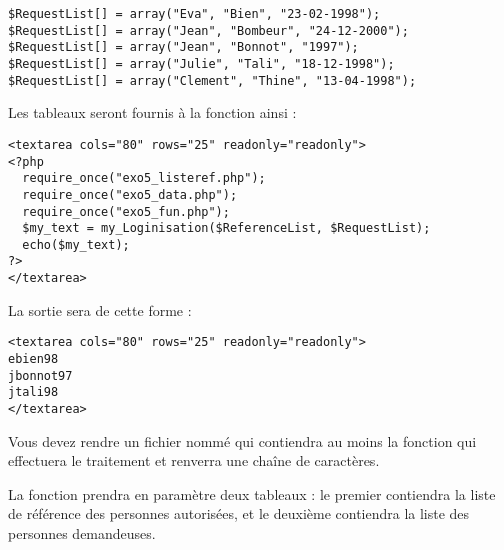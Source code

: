 \lstset{language=sh}
\begin{lstlisting}[frame=single,title={Exemple de liste de demandes}]
$RequestList[] = array("Eva", "Bien", "23-02-1998");
$RequestList[] = array("Jean", "Bombeur", "24-12-2000");
$RequestList[] = array("Jean", "Bonnot", "1997");
$RequestList[] = array("Julie", "Tali", "18-12-1998");
$RequestList[] = array("Clement", "Thine", "13-04-1998");
\end{lstlisting}

\bigskip

\noindent Les tableaux seront fournis à la fonction ainsi : \\

\lstset{language=html}
\begin{lstlisting}[frame=single,title={Appel de la fonction}]
<textarea cols="80" rows="25" readonly="readonly">
<?php
  require_once("exo5_listeref.php");
  require_once("exo5_data.php");
  require_once("exo5_fun.php");
  $my_text = my_Loginisation($ReferenceList, $RequestList);
  echo($my_text);
?>
</textarea>
\end{lstlisting}

%
%

\bigskip

\noindent La sortie sera de cette forme :\\

\lstset{language=html}
\begin{lstlisting}[frame=single,title={Sortie HTML attendue}]
<textarea cols="80" rows="25" readonly="readonly">
ebien98
jbonnot97
jtali98
</textarea>
\end{lstlisting}

\bigskip

\noindent Vous devez rendre un fichier nommé  qui contiendra au moins la fonction  qui effectuera le traitement et renverra une chaîne de caractères.

\noindent La fonction prendra en paramètre deux tableaux : le premier contiendra la liste de référence des personnes autorisées, et le deuxième contiendra la liste des personnes demandeuses.

\bigskip

